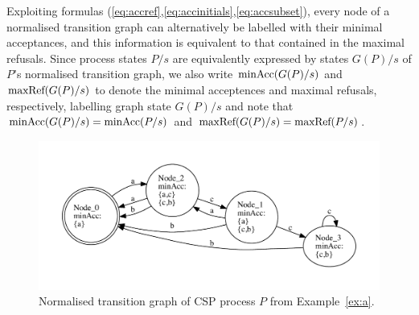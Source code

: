 Exploiting formulas (\ref{eq:accref},\ref{eq:accinitials},\ref{eq:accsubset}),
every node of a normalised transition graph can alternatively be labelled
with their minimal acceptances, and this information is equivalent to that
contained in the maximal refusals. Since process states $P/s$ are equivalently expressed
by states $G(P)/s$ of $P$'s normalised transition graph, we also write
$\text{minAcc}(G(P)/s)$ and $\text{maxRef}(G(P)/s)$ to denote the minimal acceptences and maximal refusals, respectively, labelling graph state $G(P)/s$ and note 
that $\text{minAcc}(G(P)/s) = \text{minAcc}(P/s)$ and $\text{maxRef}(G(P)/s) = \text{maxRef}(P/s)$.

 \begin{figure}[t]
   \begin{center}
     \includegraphics[width=\textwidth]{q0.pdf}
   \end{center}
   \caption{Normalised transition graph of CSP process $P$ from Example~\ref{ex:a}.}
   \label{fig:tga}
 \end{figure}


